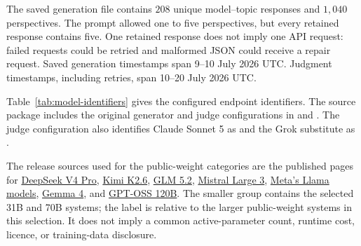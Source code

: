 \documentclass[11pt,a4paper]{article}
\begin{document}
The saved generation file contains $208$ unique model--topic responses and $1{,}040$ perspectives. The prompt allowed one to five perspectives, but every retained response contains five. One retained response does not imply one API request: failed requests could be retried and malformed JSON could receive a repair request. Saved generation timestamps span 9--10 July 2026 UTC. Judgment timestamps, including retries, span 10--20 July 2026 UTC.

Table~\ref{tab:model-identifiers} gives the configured endpoint identifiers. The source package includes the original generator and judge configurations in  and . The judge configuration also identifies Claude Sonnet 5 as  and the Grok substitute as .



The release sources used for the public-weight categories are the published pages for \href{https://huggingface.co/deepseek-ai/DeepSeek-V4-Pro}{DeepSeek V4 Pro}, \href{https://huggingface.co/moonshotai/Kimi-K2.6}{Kimi K2.6}, \href{https://huggingface.co/zai-org/GLM-5.2}{GLM 5.2}, \href{https://huggingface.co/collections/mistralai/mistral-large-3}{Mistral Large 3}, \href{https://ai.meta.com/llama/get-started/}{Meta's Llama models}, \href{https://blog.google/innovation-and-ai/technology/developers-tools/gemma-4/}{Gemma 4}, and \href{https://huggingface.co/openai/gpt-oss-120b}{GPT-OSS 120B}. The smaller group contains the selected 31B and 70B systems; the label is relative to the larger public-weight systems in this selection. It does not imply a common active-parameter count, runtime cost, licence, or training-data disclosure.
\end{document}
